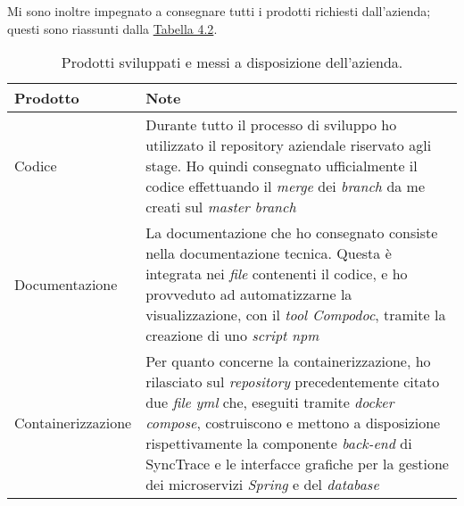 Mi sono inoltre impegnato a consegnare tutti i prodotti richiesti dall'azienda; questi sono riassunti dalla \hyperref[tab:prodotti-sviluppati]{Tabella 4.2}.

\begin{table}[h]
  \label{tab:prodotti-sviluppati}
  \begin{center}
  \begin{tabular}{lp{9cm}}
  \textbf{Prodotto}                        & \textbf{Note}                                                                                                                                                                                                                                                                                                                                    \\ \hline
  \multicolumn{1}{|l|}{Codice}             & \multicolumn{1}{p{9cm}|}{Durante tutto il processo di sviluppo ho utilizzato il repository aziendale riservato agli stage. Ho quindi consegnato ufficialmente il codice effettuando il \textit{merge} dei \textit{branch} da me creati sul \textit{master branch}}                                                                                                               \\ \hline
  \multicolumn{1}{|l|}{Documentazione}     & \multicolumn{1}{p{9cm}|}{La documentazione che ho consegnato consiste nella documentazione tecnica. Questa è integrata nei \textit{file} contenenti il codice, e ho provveduto ad automatizzarne la visualizzazione, con il \textit{tool Compodoc}, tramite la creazione di uno \textit{script npm}}                                                                             \\ \hline
  \multicolumn{1}{|l|}{Containerizzazione} & \multicolumn{1}{p{9cm}|}{Per quanto concerne la containerizzazione, ho rilasciato sul \textit{repository} precedentemente citato due \textit{file yml} che, eseguiti tramite \textit{docker compose}, costruiscono e mettono a disposizione rispettivamente la componente \textit{back-end} di SyncTrace e le interfacce grafiche per la gestione dei microservizi \textit{Spring} e del \textit{database}} \\ \hline
  \end{tabular}
\end{center}
\caption{Prodotti sviluppati e messi a disposizione dell'azienda.}
  \end{table}


